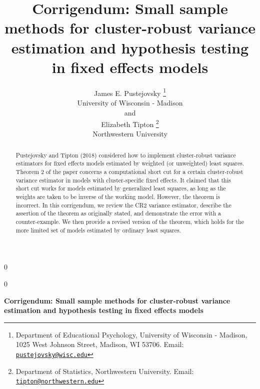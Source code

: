 \documentclass[12pt]{article}
\newcommand{\blind}{0}
\begin{document}
\def\spacingset#1{\renewcommand{\baselinestretch}%
{#1}\small\normalsize} \spacingset{1}



\blind
{
  \title{\bf Corrigendum: Small sample methods for cluster-robust
variance estimation and hypothesis testing in fixed effects models}

  \author{
        James E. Pustejovsky \thanks{Department of Educational
Psychology, University of Wisconsin - Madison, 1025 West Johnson Street,
Madison, WI 53706. Email:
\href{mailto:pustejovsky@wisc.edu}{\nolinkurl{pustejovsky@wisc.edu}}} \\
    University of Wisconsin - Madison\\
     and \\     Elizabeth Tipton \thanks{Department of Statistics,
Northwestern University. Email:
\href{mailto:tipton@northwestern.edu}{\nolinkurl{tipton@northwestern.edu}}} \\
    Northwestern University\\
      }
  \maketitle
} \fi

\blind
{
  \bigskip
  \bigskip
  \bigskip
  \begin{center}
    {\LARGE\bf Corrigendum: Small sample methods for cluster-robust
variance estimation and hypothesis testing in fixed effects models}
  \end{center}
  \medskip
} \fi

\bigskip
\begin{abstract}
Pustejovsky and Tipton (2018) considered how to implement cluster-robust
variance estimators for fixed effects models estimated by weighted (or
unweighted) least squares. Theorem 2 of the paper concerns a
computational short cut for a certain cluster-robust variance estimator
in models with cluster-specific fixed effects. It claimed that this
short cut works for models estimated by generalized least squares, as
long as the weights are taken to be inverse of the working model.
However, the theorem is incorrect. In this corrigendum, we review the
CR2 variance estimator, describe the assertion of the theorem as
originally stated, and demonstrate the error with a counter-example. We
then provide a revised version of the theorem, which holds for the more
limited set of models estimated by ordinary least squares.
\end{abstract}
\end{document}
